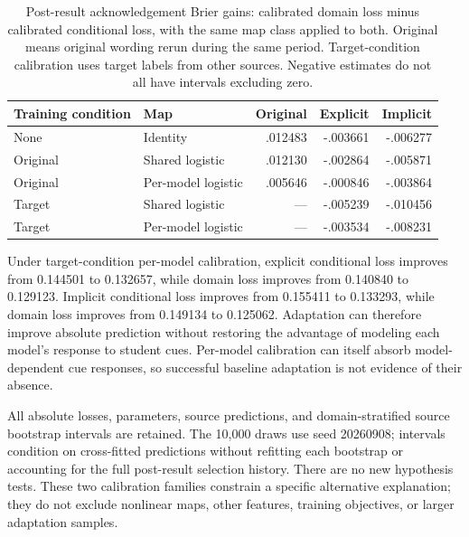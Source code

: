 \begin{table}[ht]
\centering\small
\begin{tabular}{llrrr}
\toprule
Training condition & Map & Original & Explicit & Implicit\\
\midrule
None & Identity & .012483 & -.003661 & -.006277\\
Original & Shared logistic & .012130 & -.002864 & -.005871\\
Original & Per-model logistic & .005646 & -.000846 & -.003864\\
Target & Shared logistic & --- & -.005239 & -.010456\\
Target & Per-model logistic & --- & -.003534 & -.008231\\
\bottomrule
\end{tabular}
\caption{Post-result acknowledgement Brier gains: calibrated domain loss minus
calibrated conditional loss, with the same map class applied to both. Original
means original wording rerun during the same period. Target-condition calibration uses target labels
from other sources. Negative estimates do not all have intervals excluding zero.}
\end{table}

Under target-condition per-model calibration, explicit conditional loss improves from
0.144501 to 0.132657, while domain loss improves from 0.140840 to 0.129123.
Implicit conditional loss improves from 0.155411 to 0.133293, while domain loss
improves from 0.149134 to 0.125062. Adaptation can therefore improve absolute
prediction without restoring the advantage of modeling each model's
response to student cues.
Per-model calibration can itself absorb model-dependent cue responses, so
successful baseline adaptation is not evidence of their absence.

All absolute losses, parameters, source predictions, and domain-stratified
source bootstrap intervals are retained. The 10,000 draws use seed 20260908;
intervals condition on cross-fitted predictions without refitting each bootstrap
or accounting for the full post-result selection history. There are no new
hypothesis tests. These two calibration families constrain a specific
alternative explanation; they do not exclude nonlinear maps, other features,
training objectives, or larger adaptation samples.
